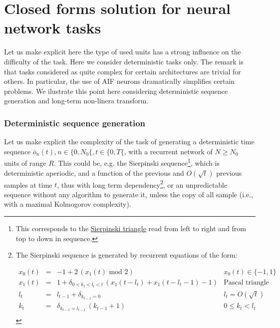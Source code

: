 \section{Closed forms solution for neural network tasks} \label{closedforms}

Let us make explicit here the type of used units has a strong influence on the difficulty of the task. Here we consider deterministic tasks only. The remark is that tasks considered as quite complex \cite{Hochreiter:1997,Gers:2003,martens_learning_2016} for certain architectures are trivial for others. In particular, the use of AIF neurons dramatically simplifies certain problems. We ilustrate this point here considering deterministic sequence generation and long-term non-linera transform.

\subsubsection*{Deterministic sequence generation}

Let us make explicit the complexity of the task of generating a deterministic time sequence $\bar{o}_n(t), n \in \{0, N_0\{, t \in \{0, T\{$, with a recurrent network of $N \ge N_0$ units of range $R$. This could be, e.g. the Sierpinski sequence\footnote{This corresponds to the \href{https://en.wikipedia.org/wiki/Sierpinski_triangle}{Sierpinski triangle} read from left to right and from top to down in sequence.}, which is deterministic aperiodic, and a function of the previous and $O(\sqrt{t})$ previous samples at time $t$, thus with long term dependency\footnote{The Sierpinski sequence is generated by recurrent equations of the form:
\\ \centerline{$\begin{array}{rcll}
x_0(t) &=& -1 + 2 \, (x_1(t) \mbox{ mod } 2) & x_0(t) \in \{-1, 1\} \\
x_1(t) &=& 1 + \delta_{0 < k_t < l_t < t} \, (x_1(t-l_t) + x_1(t-l_t-1) - 1) & \mbox{Pascal triangle sequence}\\
l_t &=& l_{t-1} + \delta_{k_{t-1} = 0} & l_t = O(\sqrt{t})\\
k_t &=& \delta_{k_{t-1} = l_{t-1}} \, (k_{t-1} + 1) & 0 \leq k_t < l_t\\
\end{array}$}}, or an unpredictable sequence without any algorithm to generate it, unless the copy of all sample (i.e., with a maximal Kolmogorov complexity).

